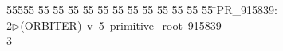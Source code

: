 %
%
\begin{tabbing}
55555 \= 55 \= 55 \= 55 \= 55 \= 55 \= 55 \= 55 \= 55 \= 55 \= 55 \= 55 \= 55 \= \>PR\_915839:\\[0pt]
2\>$\triangleright$\>(ORBITER)\ v\ 5\ primitive\_root\ 915839\\[0pt]
3\>\end{tabbing}
